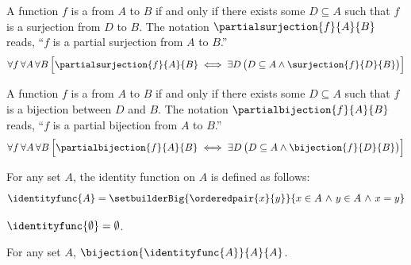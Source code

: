 \begin{dfn}
    \label{dfn:partial-surjection}
    A function \( f \) is a  from \( A \) to \( B \) if and only if there exists some \( D \subseteq A \)
    such that \( f \) is a surjection from \( D \) to \( B \). The notation \( \partialsurjection{f}{A}{B} \) reads,
    ``\( f \) is a partial surjection from \( A \) to \( B \).''
    \begin{equation*}
        \forall f \, \forall A \, \forall B \, \Big[ \partialsurjection{f}{A}{B} \iff \exists D \, \big( D \subseteq A \land \surjection{f}{D}{B} \big) \Big]
    \end{equation*}
\end{dfn}

\begin{dfn}
     \label{dfn:partial-bijection}
    A function \( f \) is a  from \( A \) to \( B \)
    if and only if there exists some \( D \subseteq A \)
    such that \( f \) is a bijection between \( D \) and \( B \).
    The notation \( \partialbijection{f}{A}{B} \) reads,
    ``\( f \) is a partial bijection from \( A \) to \( B \).''
    \begin{equation*}
        \forall f \, \forall A \, \forall B \, \Big[ \partialbijection{f}{A}{B} \iff \exists D \, \big( D \subseteq A \land \bijection{f}{D}{B} \big) \Big]
    \end{equation*}
\end{dfn}

\begin{dfn}
     \label{dfn:identity-function}
    For any set \( A \), the identity function on \( A \) is defined as follows:
    \begin{equation*}
        \identityfunc{A} = \setbuilderBig{\orderedpair{x}{y}}{ x \in A \,\,{\land}\,\, y \in A \,\,{\land}\,\, x = y}
    \end{equation*}
\end{dfn}

\begin{cor}
     \label{cor:identity-function-of-empty-set-is-the-empty-set}
    \( \identityfunc{\emptyset} = \emptyset \).
\end{cor}

\begin{cor}
     \label{cor:identity-function-is-a-bijection}
    For any set \( A \), \( \bijection{\identityfunc{A}}{A}{A} \).
\end{cor}

